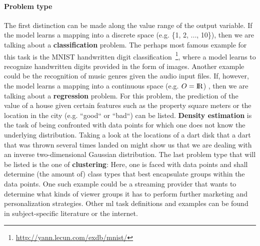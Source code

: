 \paragraph*{Problem type}
The first distinction can be made along the value range of the output variable. If the model learns a mapping into a discrete space (e.g. \{1, 2, ..., 10\}), then we are talking about a \textbf{classification} problem. The perhaps most famous example for this task is the MNIST handwritten digit classification~\footnote{\url{http://yann.lecun.com/exdb/mnist/}}, where a model learns to recognize handwritten digits provided in the form of images. Another example could be the recognition of music genres given the audio input files. If, however, the model learns a mapping into a continuous space (e.g. $ O = {\rm I\!R} $) , then we are talking about a \textbf{regression} problem. For this problem, the prediction of the value of a house given certain features such as the property square meters or the location in the city (e.g. “good“ or “bad“) can be listed. \textbf{Density estimation} is the task of being confronted with data points for which one does not know the underlying distribution. Taking a look at the locations of a dart disk that a dart that was thrown several times landed on might show us that we are dealing with an inverse two-dimensional Gaussian distribution. The last problem type that will be listed is the one of \textbf{clustering}: Here, one is faced with data points and shall determine (the amount of) class types that best encapsulate groups within the data points. One such example could be a streaming provider that wants to determine what kinds of viewer groups it has to perform further marketing and personalization strategies. Other \gls{ml} task definitions and examples can be found in subject-specific literature or the internet.

